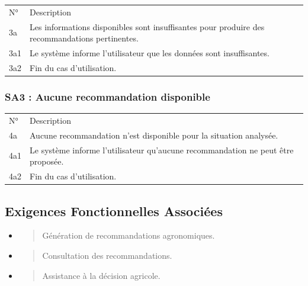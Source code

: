 \documentclass[
]{book}
\begin{document}
\begin{longtable}[]{@{}ll@{}}
\toprule
\endhead
N° & Description \\
3a & Les informations disponibles sont insuffisantes pour produire des
recommandations pertinentes. \\
3a1 & Le système informe l'utilisateur que les données sont
insuffisantes. \\
3a2 & Fin du cas d'utilisation. \\
\bottomrule
\end{longtable}

\hypertarget{sa3-aucune-recommandation-disponible}{%
\subsubsection{SA3 : Aucune recommandation
disponible}\label{sa3-aucune-recommandation-disponible}}

\begin{longtable}[]{@{}ll@{}}
\toprule
\endhead
N° & Description \\
4a & Aucune recommandation n'est disponible pour la situation
analysée. \\
4a1 & Le système informe l'utilisateur qu'aucune recommandation ne peut
être proposée. \\
4a2 & Fin du cas d'utilisation. \\
\bottomrule
\end{longtable}

\hypertarget{exigences-fonctionnelles-associuxe9es-4}{%
\subsection{Exigences Fonctionnelles
Associées}\label{exigences-fonctionnelles-associuxe9es-4}}

\begin{itemize}
\item
  \begin{quote}
  Génération de recommandations agronomiques.
  \end{quote}
\item
  \begin{quote}
  Consultation des recommandations.
  \end{quote}
\item
  \begin{quote}
  Assistance à la décision agricole.
  \end{quote}
\end{itemize}
\end{document}
